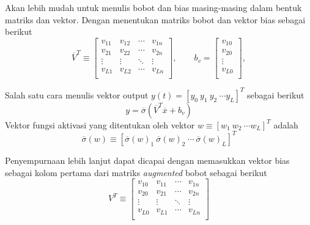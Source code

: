 Akan lebih mudah untuk menulis bobot dan bias masing-masing dalam bentuk matriks dan vektor. Dengan menentukan matriks bobot dan vektor bias sebagai berikut
\vspace{-1em}
\begin{equation} \label{eq:3:weightVector}
\overline{V}^T \equiv
\left[
\begin{matrix}
v_{11} & v_{12} & \cdots & v_{1n} \\
v_{21} & v_{22} & \cdots & v_{2n} \\
\vdots & \vdots & \ddots & \vdots \\
v_{L1} & v_{L2} & \cdots & v_{Ln} \\
\end{matrix}
\right], \qquad
b_v = 
\left[
\begin{matrix}
v_{10} \\
v_{20} \\
\vdots \\
v_{L0} \\
\end{matrix}
\right],
\end{equation}

\noindent Salah satu cara menulis vektor output $y(t) = [y_0\ y_1\ y_2\ \cdots y_L]^T$ sebagai berikut
\vspace{-1em}
\begin{equation} \label{eq:3:outputVector}
y = \overline{\sigma}(\overline{V}^T\overline{x}+b_v)
\end{equation}
\noindent Vektor fungsi aktivasi yang ditentukan oleh vektor $w\equiv [w_1\ w_2\ \cdots w_L]^T$ adalah
\vspace{-1em}
\begin{equation} \label{eq:3:activation}
\overline{\sigma}(w)\equiv [\overline{\sigma}(w)_1\ \overline{\sigma}(w)_2\ \cdots\ \overline{\sigma}(w)_L]^T
\end{equation}

Penyempurnaan lebih lanjut dapat dicapai dengan memasukkan vektor bias sebagai kolom pertama dari matriks \textit{augmented} bobot sebagai berikut
\vspace{-1em}
\begin{equation} \label{eq:3:fullVector}
V^T \equiv
\left[
\begin{matrix}
v_{10} & v_{11} & \cdots & v_{1n} \\
v_{20} & v_{21} & \cdots & v_{2n} \\
\vdots & \vdots & \ddots & \vdots \\
v_{L0} & v_{L1} & \cdots & v_{Ln} \\
\end{matrix}
\right]
\end{equation}\

